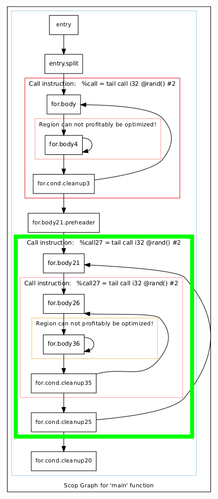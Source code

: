 \documentclass[aspectratio=169, xcolor=dvipsnames]{beamer}
\begin{document}
{\begin{frame}
        \includegraphics[height=1.2\textheight]{gfx/matmulScops(4).png}
    \end{frame}
    \begin{frame}
        \vspace*{-1.5cm}
        \centering

\end{frame}}
\end{document}
